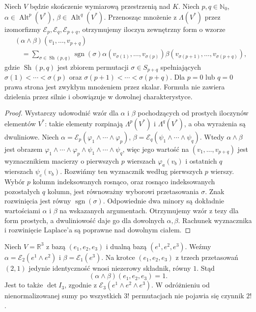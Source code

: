 \begin{wniosek}
\label{cor:lin10-shuffle}
Niech \(V\) będzie skończenie
wymiarową przestrzenią nad \(K\).
Niech \(p,q\in\mathbb N_0\),
\(\alpha\in\operatorname{Alt}^p(V^*)\),
\(\beta\in\operatorname{Alt}^q(V^*)\).
Przenosząc mnożenie z
\(\Lambda(V^*)\) przez izomorfizmy
\(\mathcal E_p,\mathcal E_q,
\mathcal E_{p+q}\), otrzymujemy
iloczyn zewnętrzny form
o wzorze
\[
 \begin{aligned}
 &(\alpha\wedge\beta)(v_1,\ldots,v_{p+q})\\
 &\quad=\sum_{\sigma\in\operatorname{Sh}(p,q)}
  \operatorname{sgn}(\sigma)
  \alpha(v_{\sigma(1)},\ldots,v_{\sigma(p)})
  \beta(v_{\sigma(p+1)},\ldots,v_{\sigma(p+q)}),
 \end{aligned}
\]
gdzie \(\operatorname{Sh}(p,q)\) jest
zbiorem permutacji \(\sigma\in S_{p+q}\)
spełniających
\(\sigma(1)<\cdots<\sigma(p)\) oraz
\(\sigma(p+1)<\cdots<\sigma(p+q)\).
Dla \(p=0\) lub \(q=0\)
prawa strona jest zwykłym
mnożeniem przez skalar.
Formuła nie zawiera dzielenia
przez silnie i obowiązuje
w dowolnej charakterystyce.
\end{wniosek}
\begin{proof}
Wystarczy udowodnić wzór
dla \(\alpha\) i \(\beta\)
pochodzących od prostych
iloczynów elementów \(V^*\):
takie elementy rozpinają
\(\Lambda^p(V^*)\) i
\(\Lambda^q(V^*)\), a oba
wyrażenia są dwuliniowe.
Niech
\(\alpha=\mathcal E_p(
 \varphi_1\wedge\cdots\wedge\varphi_p)\),
\(\beta=\mathcal E_q(
 \psi_1\wedge\cdots\wedge\psi_q)\).
Wtedy \(\alpha\wedge\beta\)
jest obrazem
\(\varphi_1\wedge\cdots\wedge\varphi_p
\wedge\psi_1\wedge\cdots\wedge\psi_q\),
więc jego wartość na
\((v_1,\ldots,v_{p+q})\)
jest wyznacznikiem macierzy
o pierwszych \(p\) wierszach
\(\varphi_a(v_b)\) i ostatnich
\(q\) wierszach \(\psi_c(v_b)\).
Rozwińmy ten wyznacznik
według pierwszych \(p\) wierszy.
Wybór \(p\) kolumn
indeksowanych rosnąco,
oraz rosnąco indeksowanych
pozostałych \(q\) kolumn,
jest równoważny wyborowi
przetasowania \(\sigma\).
Znak rozwinięcia jest równy
\(\operatorname{sgn}(\sigma)\).
Odpowiednie dwa minory
są dokładnie wartościami
\(\alpha\) i \(\beta\)
na wskazanych argumentach.
Otrzymujemy wzór z tezy
dla form prostych, a
dwuliniowość daje go dla
dowolnych \(\alpha,\beta\).
Rachunek wyznacznika i
rozwinięcie Laplace'a są
poprawne nad dowolnym ciałem.
\end{proof}

\begin{przyklad}
\label{prz:lin10-shuffle}
Niech \(V=\mathbb R^3\)
z bazą \((e_1,e_2,e_3)\)
i dualną bazą \((e^1,e^2,e^3)\).
Weźmy
\(\alpha=\mathcal E_2(e^1\wedge e^2)\)
i \(\beta=\mathcal E_1(e^3)\).
Na krotce \((e_1,e_2,e_3)\)
z trzech przetasowań \((2,1)\)
jedynie identyczność wnosi
niezerowy składnik, równy \(1\).
Stąd
\[
 (\alpha\wedge\beta)(e_1,e_2,e_3)=1.
\]
Jest to także
\(\det I_3\), zgodnie z
\(\mathcal E_3(e^1\wedge e^2\wedge e^3)\).
W odróżnieniu od
nienormalizowanej sumy po
wszystkich \(3!\) permutacjach
nie pojawia się czynnik \(2!\).
\end{przyklad}

